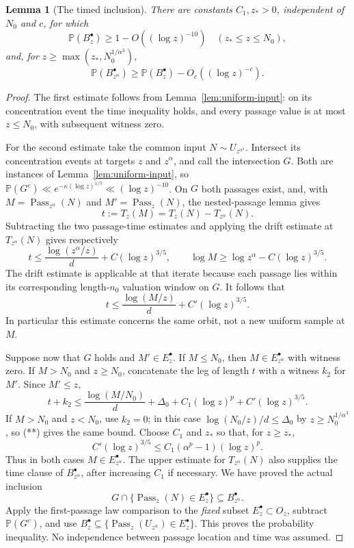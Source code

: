 \documentclass[11pt]{article}
\newtheorem{lemma}[proposition]{Lemma}
\theoremstyle{remark}\newtheorem{remark}[proposition]{Remark}
\newcommand{\PP}{\mathbb P}
\begin{document}
\begin{lemma}[The timed inclusion]
\label{lem:timed-step}
There are constants $C_1,z_*>0$, independent of $N_0$ and $c$, for which
\[
 \PP(B_z^\bullet)\ge1-O((\log z)^{-10})
       \quad (z_*\le z\le N_0),
\]
and, for $z\ge\max(z_*,N_0^{1/\alpha^3})$,
\[
 \PP(B_{z^\alpha}^\bullet)
       \ge\PP(B_z^\bullet)-O_c((\log z)^{-c}).
\]
\end{lemma}
\begin{proof}
The first estimate follows from Lemma~\ref{lem:uniform-input}: on its
concentration event the time inequality holds, and every passage
value is at most $z\le N_0$, with subsequent witness zero.

For the second estimate take the common input $N\sim U_{z^{\alpha^2}}$.
Intersect its concentration events at targets $z$ and $z^\alpha$,
and call the intersection $G$. Both are instances of
Lemma~\ref{lem:uniform-input}, so
$\PP(G^c)\ll e^{-\kappa(\log z)^{1/5}}\ll(\log z)^{-10}$.
On $G$ both passages exist, and, with
$M=\operatorname{Pass}_{z^\alpha}(N)$ and
$M'=\operatorname{Pass}_z(N)$, the nested-passage lemma gives
\[
 t:=T_z(M)=T_z(N)-T_{z^\alpha}(N).
\]
Subtracting the two passage-time estimates and applying the drift
estimate at $T_{z^\alpha}(N)$ gives respectively
\[
 t\le\frac{\log(z^\alpha/z)}d+C(\log z)^{3/5},
 \qquad
 \log M\ge\log z^\alpha-C(\log z)^{3/5}.
\]
The drift estimate is applicable at that iterate because each passage
lies within its corresponding length-$n_0$ valuation window on $G$.
It follows that
\[
 t\le\frac{\log(M/z)}d+C'(\log z)^{3/5}.                 \tag{**}
\]
In particular this estimate concerns the same orbit, not a new
uniform sample at $M$.

Suppose now that $G$ holds and $M'\in E_z^\bullet$. If $M\le N_0$,
then $M\in E_{z^\alpha}^\bullet$ with witness zero.
If $M>N_0$ and $z\ge N_0$, concatenate the leg of length $t$ with
a witness $k_2$ for $M'$. Since $M'\le z$,
\[
 t+k_2\le\frac{\log(M/N_0)}d+\Delta_0
                      +C_1(\log z)^p+C'(\log z)^{3/5}.
\]
If $M>N_0$ and $z<N_0$, use $k_2=0$; in this case
$\log(N_0/z)/d\le\Delta_0$ by $z\ge N_0^{1/\alpha^3}$,
so (**) gives the same bound. Choose $C_1$ and $z_*$ so that, for
$z\ge z_*$,
\[
 C'(\log z)^{3/5}
       \le C_1(\alpha^p-1)(\log z)^p.
\]
Thus in both cases $M\in E_{z^\alpha}^\bullet$.
The upper estimate for $T_{z^\alpha}(N)$ also supplies the time clause
of $B_{z^\alpha}^\bullet$, after increasing $C_1$ if necessary.
We have proved the actual inclusion
\[
 G\cap\{\operatorname{Pass}_z(N)\in E_z^\bullet\}
                  \subseteq B_{z^\alpha}^\bullet.
\]
Apply the first-passage law comparison to the \emph{fixed} subset
$E_z^\bullet\subset O_z$, subtract $\PP(G^c)$, and use
$B_z^\bullet\subseteq
\{\operatorname{Pass}_z(U_{z^\alpha})\in E_z^\bullet\}$.
This proves the probability inequality. No independence between
passage location and time was assumed.
\end{proof}
\end{document}
